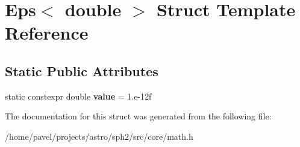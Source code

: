 \hypertarget{structEps_3_01double_01_4}{}\section{Eps$<$ double $>$ Struct Template Reference}
\label{structEps_3_01double_01_4}
\subsection*{Static Public Attributes}
\begin{DoxyCompactItemize}
\item 
\hypertarget{structEps_3_01double_01_4_a7a709ddb2d2883b9ee8e0fcf385cd3d3}{}\label{structEps_3_01double_01_4_a7a709ddb2d2883b9ee8e0fcf385cd3d3} 
static constexpr double {\bfseries value} = 1.e-\/12f
\end{DoxyCompactItemize}


The documentation for this struct was generated from the following file\+:\begin{DoxyCompactItemize}
\item 
/home/pavel/projects/astro/sph2/src/core/math.\+h\end{DoxyCompactItemize}
